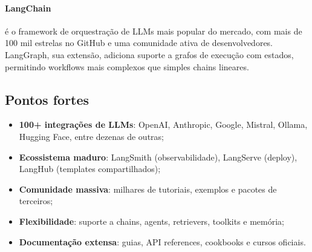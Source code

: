 \paragraph{LangChain} é o framework de orquestração de LLMs mais popular do
mercado, com mais de 100 mil estrelas no GitHub e uma comunidade ativa de
desenvolvedores. LangGraph, sua extensão, adiciona suporte a grafos de
execução com estados, permitindo workflows mais complexos que simples chains
lineares.
\subsection{Pontos fortes}
\begin{itemize}
\item \textbf{100+ integrações de LLMs}: OpenAI, Anthropic, Google,
Mistral, Ollama, Hugging Face, entre dezenas de outras;
\item \textbf{Ecossistema maduro}: LangSmith (observabilidade),
LangServe (deploy), LangHub (templates compartilhados);
\item \textbf{Comunidade massiva}: milhares de tutoriais, exemplos e
pacotes de terceiros;
\item \textbf{Flexibilidade}: suporte a chains, agents, retrievers,
toolkits e memória;
\item \textbf{Documentação extensa}: guias, API references,
cookbooks e cursos oficiais.
\end{itemize}
